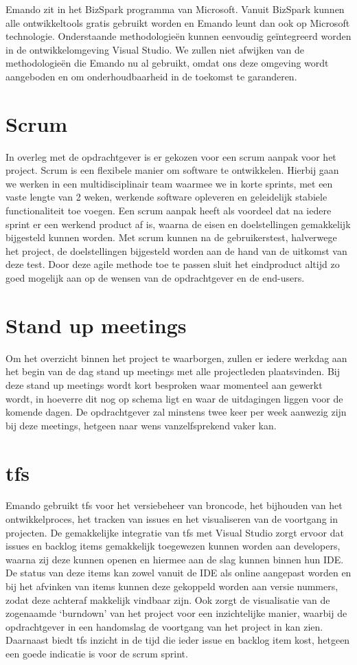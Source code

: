 Emando zit in het BizSpark programma van Microsoft. Vanuit BizSpark kunnen alle ontwikkeltools gratis gebruikt worden en Emando leunt dan ook op Microsoft technologie. Onderstaande methodologieën kunnen eenvoudig geïntegreerd worden in de ontwikkelomgeving Visual Studio. We zullen niet afwijken van de methodologieën die Emando nu al gebruikt, omdat ons deze omgeving wordt aangeboden en om onderhoudbaarheid in de toekomst te garanderen.

\section{Scrum}
In overleg met de opdrachtgever is er gekozen voor een scrum aanpak voor het project. Scrum is een flexibele manier om software te ontwikkelen. Hierbij gaan we werken in een multidisciplinair team waarmee we in korte sprints, met een vaste lengte van 2 weken, werkende software opleveren en geleidelijk stabiele functionaliteit toe voegen. Een scrum aanpak heeft als voordeel dat na iedere sprint er een werkend product af is, waarna de eisen en doelstellingen gemakkelijk bijgesteld kunnen worden. Met scrum kunnen na de gebruikerstest, halverwege het project, de doelstellingen bijgesteld worden aan de hand van de uitkomst van deze test. Door deze agile methode toe te passen sluit het eindproduct altijd zo goed mogelijk aan op de wensen van de opdrachtgever en de end-users.

\section{Stand up meetings}
Om het overzicht binnen het project te waarborgen, zullen er iedere werkdag aan het begin van de dag stand up meetings met alle projectleden plaatsvinden. Bij deze stand up meetings wordt kort besproken waar momenteel aan gewerkt wordt, in hoeverre dit nog op schema ligt en waar de uitdagingen liggen voor de komende dagen. De opdrachtgever zal minstens twee keer per week aanwezig zijn bij deze meetings, hetgeen naar wens vanzelfsprekend vaker kan.

\section{\acl{tfs}}
Emando gebruikt \ac{tfs} voor het versiebeheer van broncode, het bijhouden van het ontwikkelproces, het tracken van issues en het visualiseren van de voortgang in projecten. De gemakkelijke integratie van \ac{tfs} met Visual Studio zorgt ervoor dat issues en backlog items gemakkelijk toegewezen kunnen worden aan developers, waarna zij deze kunnen openen en hiermee aan de slag kunnen binnen hun IDE. De status van deze items kan zowel vanuit de IDE als online aangepast worden en bij het afvinken van items kunnen deze gekoppeld worden aan versie nummers, zodat deze achteraf makkelijk vindbaar zijn.
Ook zorgt de visualisatie van de zogenaamde ‘burndown’ van het project voor een inzichtelijke manier, waarbij de opdrachtgever in een handomslag de voortgang van het project in kan zien. Daarnaast biedt \ac{tfs} inzicht in de tijd die ieder issue en backlog item kost, hetgeen een goede indicatie is voor de scrum sprint.

